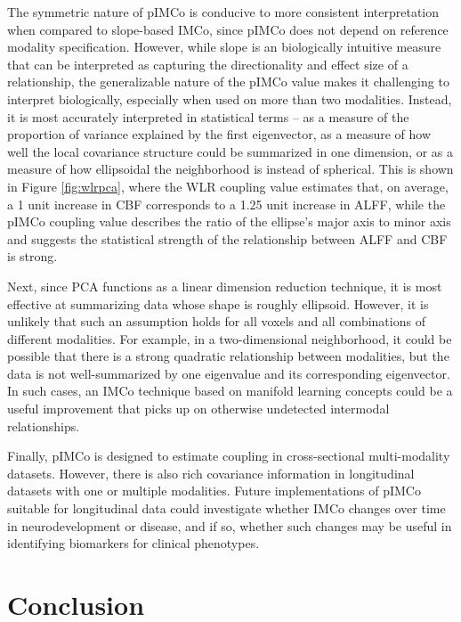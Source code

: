 \documentclass[
  12pt,
]{article}
\begin{document}
The symmetric nature of pIMCo is conducive to more consistent interpretation when compared to slope-based IMCo, since pIMCo does not depend on reference modality specification. However, while slope is an biologically intuitive measure that can be interpreted as capturing the directionality and effect size of a relationship, the generalizable nature of the pIMCo value makes it challenging to interpret biologically, especially when used on more than two modalities. Instead, it is most accurately interpreted in statistical terms -- as a measure of the proportion of variance explained by the first eigenvector, as a measure of how well the local covariance structure could be summarized in one dimension, or as a measure of how ellipsoidal the neighborhood is instead of spherical. This is shown in Figure \ref{fig:wlrpca}, where the WLR coupling value estimates that, on average, a 1 unit increase in CBF corresponds to a 1.25 unit increase in ALFF, while the pIMCo coupling value describes the ratio of the ellipse's major axis to minor axis and suggests the statistical strength of the relationship between ALFF and CBF is strong.

Next, since PCA functions as a linear dimension reduction technique, it is most effective at summarizing data whose shape is roughly ellipsoid. However, it is unlikely that such an assumption holds for all voxels and all combinations of different modalities. For example, in a two-dimensional neighborhood, it could be possible that there is a strong quadratic relationship between modalities, but the data is not well-summarized by one eigenvalue and its corresponding eigenvector. In such cases, an IMCo technique based on manifold learning concepts could be a useful improvement that picks up on otherwise undetected intermodal relationships.

Finally, pIMCo is designed to estimate coupling in cross-sectional multi-modality datasets. However, there is also rich covariance information in longitudinal datasets with one or multiple modalities. Future implementations of pIMCo suitable for longitudinal data could investigate whether IMCo changes over time in neurodevelopment or disease, and if so, whether such changes may be useful in identifying biomarkers for clinical phenotypes.

\hypertarget{conclusion}{%
\section{Conclusion}\label{conclusion}}
\end{document}
